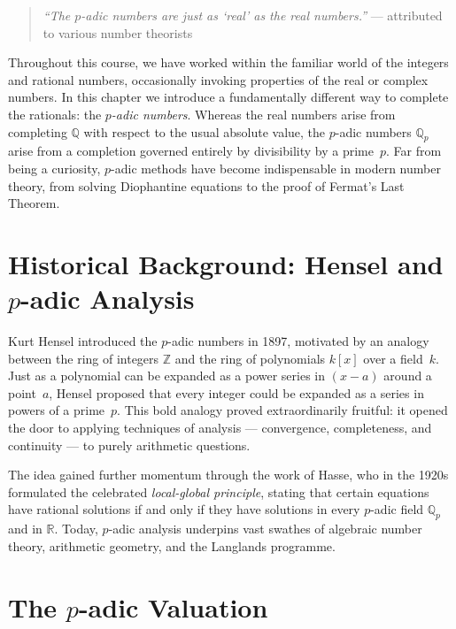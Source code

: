 \documentclass[12pt,a4paper,openany]{book}
\theoremstyle{definition}
\theoremstyle{plain}
\theoremstyle{remark}
\newcommand{\Z}{\mathbb{Z}}
\newcommand{\Q}{\mathbb{Q}}
\newcommand{\R}{\mathbb{R}}
\begin{document}
\begin{quote}
\emph{``The $p$-adic numbers are just as `real' as the real numbers.''}
--- attributed to various number theorists
\end{quote}

\noindent
Throughout this course, we have worked within the familiar world of the integers
and rational numbers, occasionally invoking properties of the real or complex
numbers. In this chapter we introduce a fundamentally different way to complete
the rationals: the \emph{$p$-adic numbers}. Whereas the real numbers arise from
completing $\Q$ with respect to the usual absolute value, the $p$-adic numbers
$\Q_p$ arise from a completion governed entirely by divisibility by a prime~$p$.
Far from being a curiosity, $p$-adic methods have become indispensable in modern
number theory, from solving Diophantine equations to the proof of Fermat's Last
Theorem.

\section{Historical Background: Hensel and \texorpdfstring{$p$}{p}-adic Analysis}
\label{sec:p-adic-history}

Kurt Hensel introduced the $p$-adic numbers in 1897, motivated
by an analogy between the ring of integers $\Z$ and the ring of polynomials
$k[x]$ over a field~$k$. Just as a polynomial can be expanded as a power series
in $(x - a)$ around a point~$a$, Hensel proposed that every integer could be
expanded as a series in powers of a prime~$p$. This bold analogy proved
extraordinarily fruitful: it opened the door to applying techniques of analysis
--- convergence, completeness, and continuity --- to purely arithmetic questions.

The idea gained further momentum through the work of Hasse,
who in the 1920s formulated the celebrated \emph{local-global principle}, stating
that certain equations have rational solutions if and only if they have solutions
in every $p$-adic field $\Q_p$ and in $\R$. Today, $p$-adic analysis underpins
vast swathes of algebraic number theory, arithmetic geometry, and the Langlands
programme.

\section{The \texorpdfstring{$p$}{p}-adic Valuation}
\label{sec:p-adic-valuation}
\end{document}
